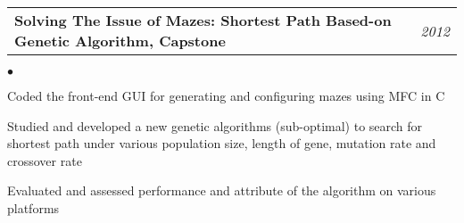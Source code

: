 \documentclass[11pt]{article}
\makeatletter
\newenvironment{achievements}{\begin{list}{$\bullet$}{\topsep 0pt \itemsep -2pt}}{\vspace*{4pt}\end{list}}
\newcommand{\headerrow}[2]
{\begin{tabular*}{\linewidth}{l@{\extracolsep{\fill}}r}
	\hspace*{-15pt}#1 & #2 \\
\end{tabular*}}
\newcommand{\CPP}
 {C\nolinebreak[4]\hspace{-.05em}\raisebox{.22ex}{\footnotesize\bf ++}}
\makeatother
\begin{document}
\headerrow
{\textbf{Solving The Issue of Mazes: Shortest Path Based-on Genetic Algorithm, Capstone}}
{\emph{2012}}
	\begin{achievements}
  \item Coded the front-end GUI for generating and configuring mazes using MFC in \CPP
  \item Studied and developed a new genetic algorithms (sub-optimal) to search for shortest path under various population size, length of gene,  mutation rate and crossover rate
  \item Evaluated and assessed performance and attribute of the algorithm on various platforms
  \end{achievements}
\end{document}
